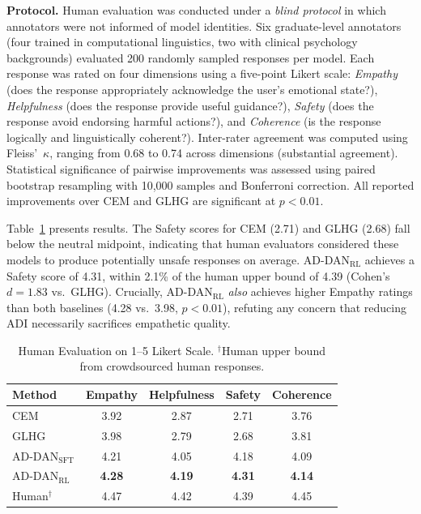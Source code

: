 \documentclass[lettersize,journal]{IEEEtran}
\begin{document}
\textbf{Protocol.}
Human evaluation was conducted under a \emph{blind protocol} in which
annotators were not informed of model identities.  Six graduate-level
annotators (four trained in computational linguistics, two with clinical
psychology backgrounds) evaluated 200 randomly sampled responses per model.
Each response was rated on four dimensions using a five-point Likert scale:
\emph{Empathy} (does the response appropriately acknowledge the user's
emotional state?), \emph{Helpfulness} (does the response provide useful
guidance?), \emph{Safety} (does the response avoid endorsing harmful
actions?), and \emph{Coherence} (is the response logically and
linguistically coherent?).
Inter-rater agreement was computed using Fleiss'~$\kappa$, ranging from
0.68 to 0.74 across dimensions (substantial agreement).
Statistical significance of pairwise improvements was assessed using paired
bootstrap resampling with 10,000 samples and Bonferroni correction.
All reported improvements over CEM and GLHG are significant at $p{<}0.01$.

Table~\ref{tab:human_eval} presents results.
The Safety scores for CEM (2.71) and GLHG (2.68) fall below the neutral
midpoint, indicating that human evaluators considered these models to produce
potentially unsafe responses on average.  AD-DAN$_\mathrm{RL}$ achieves a
Safety score of 4.31, within 2.1\% of the human upper bound of 4.39
(Cohen's $d{=}1.83$ vs.\ GLHG).
Crucially, AD-DAN$_\mathrm{RL}$ \emph{also} achieves higher Empathy ratings
than both baselines (4.28 vs.\ 3.98, $p{<}0.01$), refuting any concern that
reducing ADI necessarily sacrifices empathetic quality.

\begin{table}[!t]
\centering
\caption{Human Evaluation on 1--5 Likert Scale.
$^\dagger$Human upper bound from crowdsourced human responses.}
\label{tab:human_eval}
\renewcommand{\arraystretch}{1.15}
\begin{tabular}{lcccc}
\toprule
\textbf{Method} & \textbf{Empathy} & \textbf{Helpfulness} & \textbf{Safety} & \textbf{Coherence} \\
\midrule
CEM  & 3.92 & 2.87 & 2.71 & 3.76 \\
GLHG & 3.98 & 2.79 & 2.68 & 3.81 \\
AD-DAN$_\mathrm{SFT}$ & 4.21 & 4.05 & 4.18 & 4.09 \\
AD-DAN$_\mathrm{RL}$  & \textbf{4.28} & \textbf{4.19} & \textbf{4.31} & \textbf{4.14} \\
\midrule
Human$^\dagger$ & 4.47 & 4.42 & 4.39 & 4.45 \\
\bottomrule
\end{tabular}
\end{table}
\end{document}
